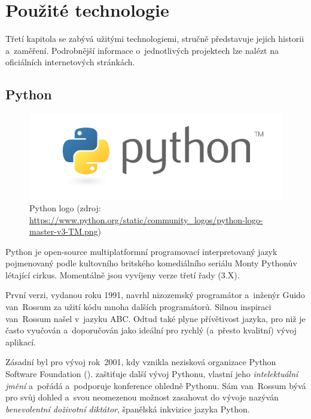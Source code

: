 \chapter{Použité technologie}
\label{3-technologie}

Třetí kapitola se zabývá užitými technologiemi, stručně představuje jejich historii a~zaměření.
Podrobnější informace o~jednotlivých projektech lze nalézt na oficiálních internetových stránkách. 


\section{Python}
\label{python}

  \begin{figure}[H]
   \centering
	\includegraphics[scale=0.5]{./pictures/python-logo-master-v3-TM.png}
	\caption[Python logo]{Python logo 
      (zdroj: \url{https://www.python.org/static/community_logos/python-logo-master-v3-TM.png})}
      \label{fig:python}
  \end{figure}

Python je open-source multiplatformní programovací interpretovaný jazyk pojme\-novaný podle
kultovního britského komediálního seriálu Monty Pythonův létající cirkus. Momentálně jsou
vyvíjeny verze třetí řady (3.X). 

První verzi, vydanou roku 1991, navrhl nizozemský programátor a~inženýr Guido van~Rossum za užití kódu
mnoha dalších programátorů. Silnou inspiraci van~Rossum našel v~jazyku ABC. Odtud také plyne
přívětivost jazyka, pro niž je často vyučován a~doporučován jako ideální pro rychlý
(a~přesto kvalitní) vývoj aplikací. 

Zásadní byl pro vývoj rok~2001, kdy vznikla nezisková organizace Python Software
Foundation ().  zaštiťuje další vývoj Pythonu, vlastní jeho
\textit{intelektuální jmění} a~pořádá a~podporuje konference ohledně Pythonu. Sám van~Rossum bývá
pro svůj dohled a~svou neomezenou možnost zasahovat do vývoje nazýván \textit{benevolentní doživotní
diktátor}, španělská inkvizice jazyka Python. 


